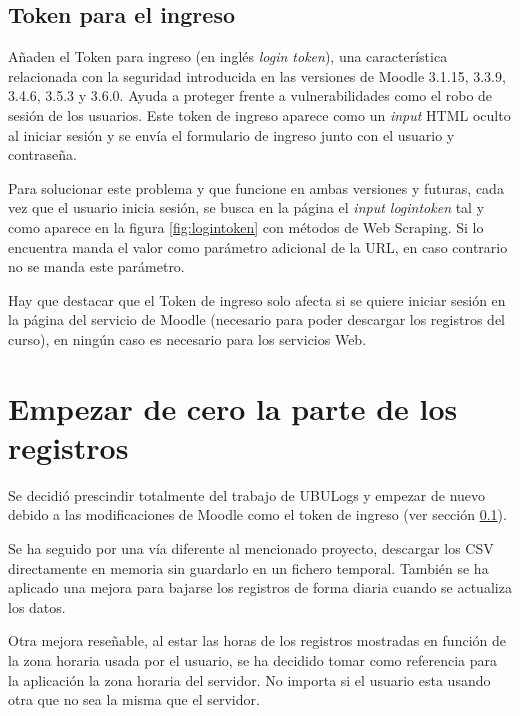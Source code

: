 \subsection{Token para el ingreso} \label{sec:logintoken}
Añaden el Token para ingreso \cite{noauthor_token_nodate} (en inglés \textit{login token}), una característica relacionada con la seguridad introducida en las versiones de Moodle 3.1.15, 3.3.9, 3.4.6, 3.5.3 y 3.6.0. Ayuda a proteger frente a vulnerabilidades como el robo de sesión de los usuarios. Este token de ingreso aparece como un \textit{input} HTML oculto\cite{noauthor_html_nodate-1} al iniciar sesión y se envía el formulario de ingreso junto con el usuario y contraseña.


Para solucionar este problema y que funcione en ambas versiones y futuras, cada vez que el usuario inicia sesión, se busca en la página el \textit{input logintoken} tal y como aparece en la figura \ref{fig:logintoken} con métodos de Web Scraping\cite{marti_que_2016}. Si lo encuentra manda el valor como parámetro adicional de la URL, en caso contrario no se manda este parámetro.

Hay que destacar que el Token de ingreso solo afecta si se quiere iniciar sesión en la página del servicio de Moodle (necesario para poder descargar los registros del curso), en ningún caso es necesario para los servicios Web.

\section{Empezar de cero la parte de los registros}

Se decidió prescindir totalmente del trabajo de UBULogs y empezar de nuevo debido a las modificaciones de Moodle como el token de ingreso (ver sección \ref{sec:logintoken}). 

Se ha seguido por una vía diferente al mencionado proyecto, descargar los CSV directamente en memoria sin guardarlo en un fichero temporal. También se ha aplicado una mejora para bajarse los registros de forma diaria cuando se actualiza los datos.

Otra mejora reseñable, al estar las horas de los registros mostradas en función de la zona horaria usada por el usuario, se ha decidido tomar como referencia para la aplicación la zona horaria del servidor. No importa si el usuario esta usando otra que no sea la misma que el servidor.

